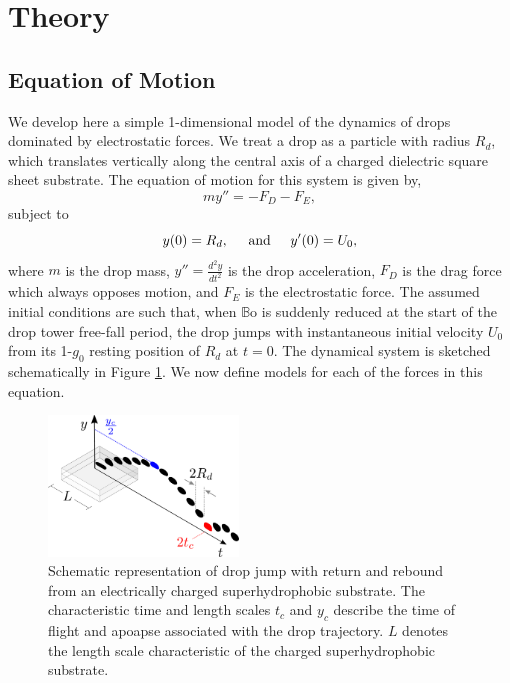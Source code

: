 \documentclass[aip,reprint, floatfix]{revtex4-1}
\begin{document}
\section{Theory}
\subsection{Equation of Motion}
We develop here a simple 1-dimensional model of the dynamics of drops dominated by electrostatic forces. We treat a drop as a particle with radius $R_d$, which translates vertically along the central axis of a charged dielectric square sheet substrate. The equation of motion for this system is given by,
\begin{equation}
m y'' = - F_D - F_E,
\label{gov_eqn}
\end{equation}
subject to
\begin{equation}
y(0) = R_d, \hspace{5 mm} \mbox{and} \hspace{5 mm} y'(0) = U_0,
\end{equation}
where $m$ is the drop mass, $y'' = \frac{d^2 y}{d t^2}$ is the drop acceleration, $F_D$ is the drag force which always opposes motion, and $F_E$ is the electrostatic force. The assumed initial conditions are such that, when $\mathbb{B}\mbox{o}$ is suddenly reduced at the start of the drop tower free-fall period, the drop jumps with instantaneous initial velocity $U_0$ from its 1-$g_0$ resting position of $R_d$ at $t=0$. The dynamical system is sketched schematically in Figure \ref{fig:apparatus}. We now define models for each of the forces in this equation.

\begin{figure}[ht]
\centering
\includegraphics[width=0.45\textwidth]{../figures/apparatus3.pdf}
\caption{Schematic representation of drop jump with return and rebound from an electrically charged superhydrophobic substrate. The characteristic time and length scales $t_c$ and $y_c$ describe the time of flight and apoapse associated with the drop trajectory. $L$ denotes the length scale characteristic of the charged superhydrophobic substrate.}
\label{fig:apparatus}
\end{figure}
\end{document}
